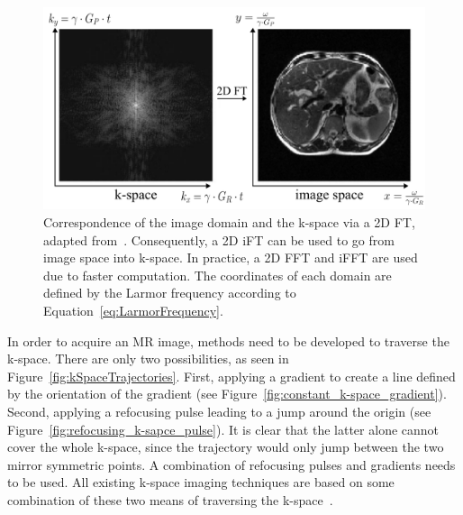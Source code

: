 \begin{figure}[H] %
	\centering
	\includegraphics[width=\linewidth]{./Images/2D_MRI_Measurement.png} 
	\caption{Correspondence of the image domain and the k-space via a 2D FT, adapted from~\cite{SamplingStrategies}. Consequently, a 2D iFT can be used to go from image space into k-space. In practice, a 2D FFT and iFFT are used due to faster computation. The coordinates of each domain are defined by the Larmor frequency according to Equation~\ref{eq:LarmorFrequency}.}
	\label{fig:2D_MRI_Measurement}
\end{figure}

\noindent In order to acquire an MR image, methods need to be developed to traverse the k-space. There are only two possibilities, as seen in Figure~\ref{fig:kSpaceTrajectories}. First, applying a gradient to create a line defined by the orientation of the gradient (see Figure~\ref{fig:constant_k-space_gradient}). 
Second, applying a refocusing pulse leading to a jump around the origin (see Figure~\ref{fig:refocusing_k-sapce_pulse}). It is clear that the latter alone cannot cover the whole k-space, since the trajectory would only jump between the two mirror symmetric points. A combination of refocusing pulses and gradients needs to be used. All existing k-space imaging techniques are based on some combination of these two means of traversing the k-space~\cite{SamplingStrategies}. 

